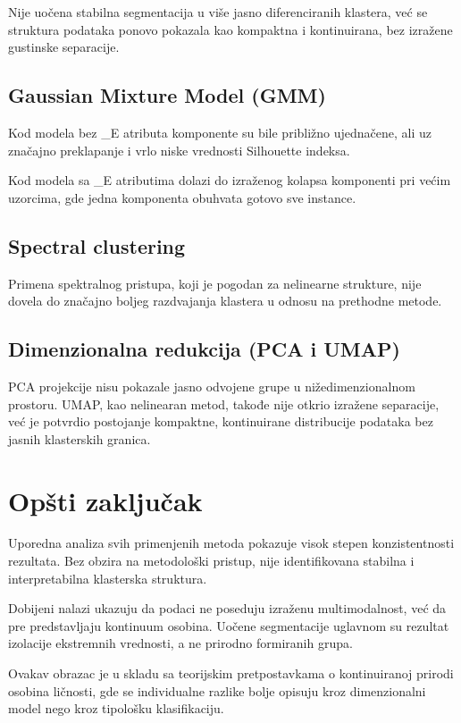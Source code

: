 \documentclass[12pt,a4paper]{article}
\begin{document}
Nije uočena stabilna segmentacija u više jasno diferenciranih klastera, već se struktura podataka ponovo pokazala kao kompaktna i kontinuirana, bez izražene gustinske separacije.

\subsection*{Gaussian Mixture Model (GMM)}
Kod modela bez \_E atributa komponente su bile približno ujednačene, ali uz značajno preklapanje i vrlo niske vrednosti Silhouette indeksa.

Kod modela sa \_E atributima dolazi do izraženog kolapsa komponenti pri većim uzorcima, gde jedna komponenta obuhvata gotovo sve instance.

\subsection*{Spectral clustering}


Primena spektralnog pristupa, koji je pogodan za nelinearne strukture, nije dovela do značajno boljeg razdvajanja klastera u odnosu na prethodne metode.

\subsection*{Dimenzionalna redukcija (PCA i UMAP)}

PCA projekcije nisu pokazale jasno odvojene grupe u nižedimenzionalnom prostoru. UMAP, kao nelinearan metod, takođe nije otkrio izražene separacije, već je potvrdio postojanje kompaktne, kontinuirane distribucije podataka bez jasnih klasterskih granica.

\section{Opšti zaključak}

Uporedna analiza svih primenjenih metoda pokazuje visok stepen konzistentnosti rezultata. Bez obzira na metodološki pristup, nije identifikovana stabilna i interpretabilna klasterska struktura.

Dobijeni nalazi ukazuju da podaci ne poseduju izraženu multimodalnost, već da pre predstavljaju kontinuum osobina. Uočene segmentacije uglavnom su rezultat izolacije ekstremnih vrednosti, a ne prirodno formiranih grupa.

Ovakav obrazac je u skladu sa teorijskim pretpostavkama o kontinuiranoj prirodi osobina ličnosti, gde se individualne razlike bolje opisuju kroz dimenzionalni model nego kroz tipološku klasifikaciju.
\end{document}
